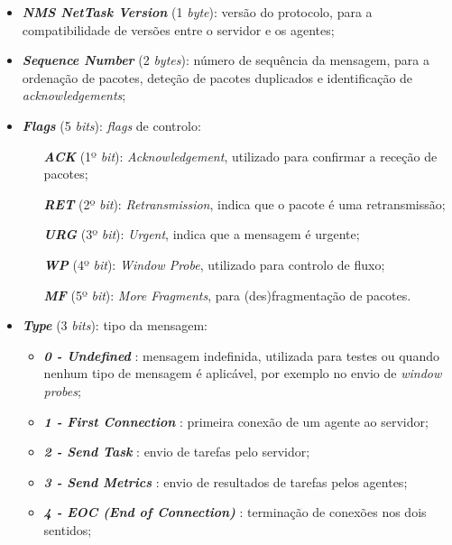\documentclass[a4paper,12pt]{scrreprt}
\begin{document}
\begin{itemize}
    \item \textbf{\textit{NMS NetTask Version}} (1 \textit{byte}):  versão do protocolo,
        para a compatibilidade de versões entre o servidor e os agentes;
    \item \textbf{\textit{Sequence Number}}     (2 \textit{bytes}): número de sequência da mensagem,
        para a ordenação de pacotes, deteção de pacotes duplicados e identificação de \textit{acknowledgements};
    \item \textbf{\textit{Flags}}               (5 \textit{bits}):  \textit{flags} de controlo:
        \begin{itemize}
           \item [\textbf{\textit{ACK}}] (1º \textit{bit}): \textit{Acknowledgement}, utilizado para confirmar a receção de pacotes;
           \item [\textbf{\textit{RET}}] (2º \textit{bit}): \textit{Retransmission}, indica que o pacote é uma retransmissão;
           \item [\textbf{\textit{URG}}] (3º \textit{bit}): \textit{Urgent}, indica que a mensagem é urgente;
           \item [\textbf{\textit{WP}} ] (4º \textit{bit}): \textit{Window Probe}, utilizado para controlo de fluxo;
           \item [\textbf{\textit{MF}} ] (5º \textit{bit}): \textit{More Fragments}, para (des)fragmentação de pacotes.
        \end{itemize}
    \item \textbf{\textit{Type}}                (3 \textit{bits}): tipo da mensagem:
        \begin{itemize}
            \item \textbf{\textit{0 - Undefined}}               : mensagem indefinida, utilizada
                para testes ou quando nenhum tipo de mensagem é aplicável,
                por exemplo no envio de \textit{window probes};
            \item \textbf{\textit{1 - First Connection}}        : primeira conexão de um agente ao servidor;
            \item \textbf{\textit{2 - Send Task}}               : envio de tarefas pelo servidor;
            \item \textbf{\textit{3 - Send Metrics}}            : envio de resultados de tarefas pelos agentes;
            \item \textbf{\textit{4 - EOC (End of Connection)}} : terminação de conexões nos dois sentidos;

\end{itemize}
\end{itemize}
\end{document}
